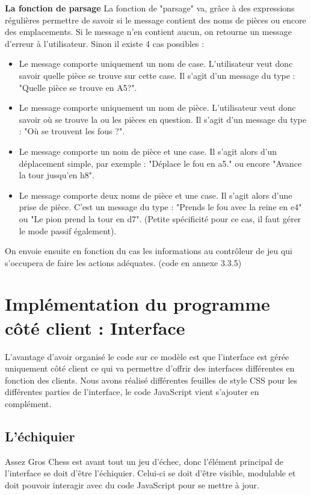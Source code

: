 \documentclass[12pt, openany]{report}
\begin{document}
\textbf{La fonction de parsage}
\newline
La fonction de "parsage" va, grâce à  des expressions régulières permettre de savoir si le message contient des noms de pièces ou encore des emplacements.
Si le message n'en contient aucun, on retourne un message d'erreur à l'utilisateur.\newline
Sinon il existe 4 cas possibles :
\begin{itemize}
    \item Le message comporte uniquement un nom de case. L'utilisateur veut donc savoir quelle pièce se trouve sur cette case. Il s'agit d'un message du type : "Quelle pièce se trouve en A5?".
    \item Le message comporte uniquement un nom de pièce. L'utilisateur veut donc savoir où se trouve la ou les pièces en question. Il s'agit d'un message du type : "Où se trouvent les fous ?".
    \item Le message comporte un nom de pièce et une case.
    Il s'agit alors d'un déplacement simple, par exemple : "Déplace le fou en a5." ou encore "Avance la tour jusqu'en h8".
    \item Le message comporte deux noms de pièce et une case. Il s'agit alors d'une prise de pièce. C'est un message du type : "Prends le fou avec la reine en e4" ou "Le pion prend la tour en d7". (Petite spécificité pour ce cas, il faut gérer le mode passif également).
\end{itemize}
On envoie ensuite en fonction du cas les informations au contrôleur de jeu qui s'occupera de faire les actions adéquates.
(code en annexe 3.3.5)

\newpage
\section{Implémentation du programme côté client : Interface}

L'avantage d'avoir organisé le code sur ce modèle est que l'interface est gérée uniquement côté client ce qui va permettre d'offrir des interfaces différentes en fonction des clients.
Nous avons réalisé différentes feuilles de style CSS pour les différentes parties de l'interface, le code JavaScript vient s'ajouter en complément.

\subsection{L'échiquier}

Assez Gros Chess est avant tout un jeu d'échec, donc l'élément principal de l'interface se doit d'être l'échiquier.
Celui-ci se doit d'être visible, modulable et doit pouvoir interagir avec du code JavaScript pour se mettre à jour.
\end{document}
